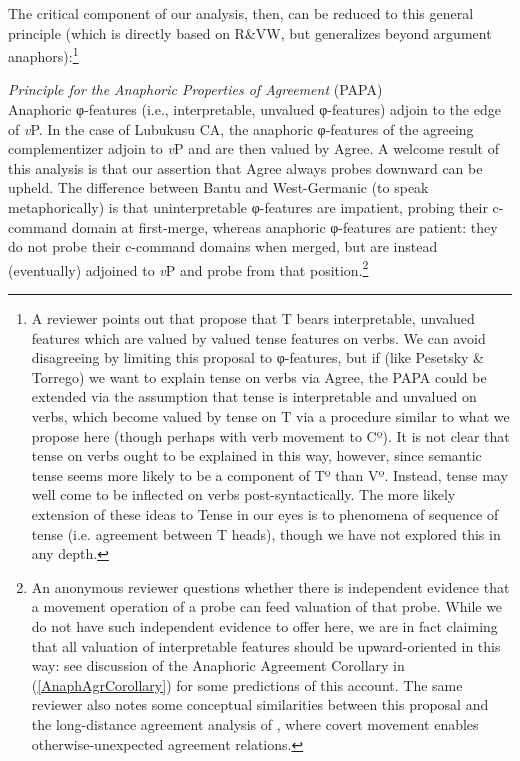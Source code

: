 \documentclass[output=paper
,modfonts
,nonflat
]{langsci/langscibook}
\begin{document}
\noindent The critical component of our analysis, then, can be reduced to this general principle (which is directly based on R\&VW, but generalizes beyond argument anaphors):\footnote{A reviewer points out that \citet{Pesetsky:2007} propose that T bears interpretable, unvalued features which are valued by valued tense features on verbs. We can avoid disagreeing by limiting this proposal to φ-features, but if (like Pesetsky \& Torrego) we want to explain tense on verbs via Agree, the PAPA could be extended via the assumption that tense is interpretable and unvalued on verbs, which become valued by tense on T via a procedure similar to what we propose here (though perhaps with verb movement to Cº). It is not clear that tense on verbs ought to be explained in this way, however, since semantic tense seems more likely to be a component of Tº than Vº. Instead, tense may well come to be inflected on verbs post-syntactically. The more likely extension of these ideas to Tense in our eyes is to phenomena of sequence of tense (i.e. agreement between T heads), though we have not explored this in any depth.} 

\ea	\label{PAPA}
\textit{Principle for the Anaphoric Properties of Agreement}  (PAPA) \\
Anaphoric φ-features (i.e., interpretable, unvalued φ-features) adjoin to the edge of \textit{v}P.
\z
\noindent In the case of Lubukusu CA, the anaphoric φ-features of the agreeing complementizer adjoin to \textit{v}P and are then valued by Agree. A welcome result of this analysis is that our assertion that Agree always probes downward can be upheld. The difference between Bantu and West-Germanic (to speak metaphorically) is that uninterpretable φ-features are impatient, probing their c-command domain at first-merge, whereas anaphoric φ-features are patient: they do not probe their c-command domains when merged, but are instead (eventually) adjoined to \textit{v}P and probe from that position.\footnote{An anonymous reviewer questions whether there is independent evidence that a movement operation of a probe can feed valuation of that probe. While we do not have such independent evidence to offer here, we are in fact claiming that all valuation of interpretable features should be upward-oriented in this way: see discussion of the Anaphoric Agreement Corollary in (\ref{AnaphAgrCorollary}) for some predictions of this account. The same reviewer also notes some conceptual similarities between this proposal and the long-distance agreement analysis of \citet{Potsdam:2001}, where covert movement enables otherwise-unexpected agreement relations.}  
\end{document}
